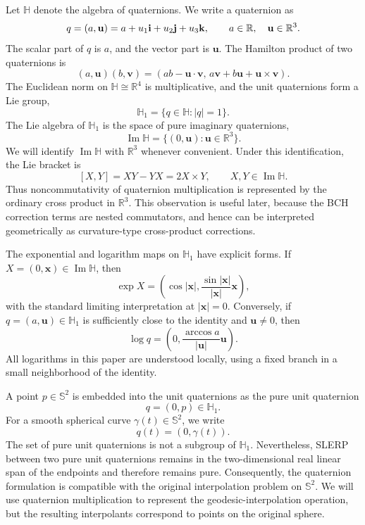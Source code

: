 \documentclass[a4paper,11pt]{article}
\newcommand{\bS}{\mathbb{S}}
\newcommand{\bR}{\mathbb{R}}
\newcommand{\bH}{\mathbb{H}}
\newcommand{\ImH}{\operatorname{Im}\bH}
\numberwithin{equation}{section}
\theoremstyle{plain}
\theoremstyle{definition}
\theoremstyle{remark}
\begin{document}
Let \(\bH\) denote the algebra of quaternions.  We write a quaternion as
\[
        q=(a,\mathbf u)
        =
        a+u_1{\bf i}+u_2{\bf j}+u_3{\bf k},
        \qquad a\in\bR,\quad \mathbf u\in\bR^3 .
\]
The scalar part of \(q\) is \(a\), and the vector part is \(\mathbf u\).  The
Hamilton product of two quaternions is
\[
(a,\mathbf u)(b,\mathbf v)
=
(ab-\mathbf u\cdot\mathbf v,\,
a\mathbf v+b\mathbf u+\mathbf u\times\mathbf v).
\]
The Euclidean norm on \(\bH\cong\bR^4\) is multiplicative, and the unit
quaternions form a Lie group,
\[
        \bH_1=\{q\in\bH: |q|=1\}.
\]
The Lie algebra of \(\bH_1\) is the space of pure imaginary quaternions,
\[
        \ImH=\{(0,\mathbf u):\mathbf u\in\bR^3\}.
\]
We will identify \(\ImH\) with \(\bR^3\) whenever convenient.  Under this
identification, the Lie bracket is
\[
        [X,Y]=XY-YX=2X\times Y,
        \qquad X,Y\in\ImH .
\]
Thus noncommutativity of quaternion multiplication is represented by the
ordinary cross product in \(\bR^3\).  This observation is useful later, because
the BCH correction terms are nested commutators, and hence can be interpreted
geometrically as curvature-type cross-product corrections.

The exponential and logarithm maps on \(\bH_1\) have explicit forms.  If
\(X=(0,\mathbf x)\in\ImH\), then
\[
        \exp X
        =
        \left(\cos |\mathbf x|,
        \frac{\sin |\mathbf x|}{|\mathbf x|}\mathbf x\right),
\]
with the standard limiting interpretation at \(|\mathbf x|=0\).  Conversely,
if \(q=(a,\mathbf u)\in\bH_1\) is sufficiently close to the identity and
\(\mathbf u\neq0\), then
\[
        \log q
        =
        \left(0,
        \frac{\arccos a}{|\mathbf u|}\mathbf u\right).
\]
All logarithms in this paper are understood locally, using a fixed branch in a
small neighborhood of the identity.

A point \(p\in\bS^2\) is embedded into the unit quaternions as the pure unit
quaternion
\[
        q=(0,p)\in\bH_1 .
\]
For a smooth spherical curve \(\gamma(t)\in\bS^2\), we write
\[
        q(t)=(0,\gamma(t)).
\]
The set of pure unit quaternions is not a subgroup of \(\bH_1\).  Nevertheless,
SLERP between two pure unit quaternions remains in the two-dimensional real
linear span of the endpoints and therefore remains pure.  Consequently, the
quaternion formulation is compatible with the original interpolation problem
on \(\bS^2\).  We will use quaternion multiplication to represent the
geodesic-interpolation operation, but the resulting interpolants correspond to
points on the original sphere.
\end{document}
